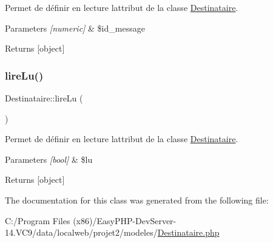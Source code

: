 Permet de définir en lecture l\textquotesingle{}attribut de la classe \hyperlink{class_destinataire}{Destinataire}. 


\begin{DoxyParams}{Parameters}
{\em \mbox{[}numeric\mbox{]}} & \$id\+\_\+message \\
\hline
\end{DoxyParams}
\begin{DoxyReturn}{Returns}
\mbox{[}object\mbox{]} 
\end{DoxyReturn}
\mbox{\label{class_destinataire_a22817a50de7a500114468dd34a3da1a2}} 
\subsubsection{\texorpdfstring{lire\+Lu()}{lireLu()}}
{\footnotesize\ttfamily Destinataire\+::lire\+Lu (\begin{DoxyParamCaption}{ }\end{DoxyParamCaption})}



Permet de définir en lecture l\textquotesingle{}attribut de la classe \hyperlink{class_destinataire}{Destinataire}. 


\begin{DoxyParams}{Parameters}
{\em \mbox{[}bool\mbox{]}} & \$lu \\
\hline
\end{DoxyParams}
\begin{DoxyReturn}{Returns}
\mbox{[}object\mbox{]} 
\end{DoxyReturn}


The documentation for this class was generated from the following file\+:\begin{DoxyCompactItemize}
\item 
C\+:/\+Program Files (x86)/\+Easy\+P\+H\+P-\/\+Dev\+Server-\/14.\+V\+C9/data/localweb/projet2/modeles/\hyperlink{_destinataire_8php}{Destinataire.\+php}\end{DoxyCompactItemize}
